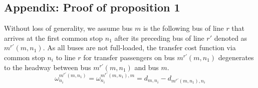 \documentclass[smallextended]{svjour3}       %
\begin{document}
\begin{Abstract}

\section*{Appendix: Proof of proposition 1}
\appendix
Without loss of generality, we assume bus $m$ is the following bus of line $r$ that arrives at the first common stop $n_{1}$ after its preceding bus of line $r'$ denoted as $m^{r'}(m,n_{1})$.
As all buses are not full-loaded, the transfer cost function via common stop $n_{i}$ to line $r$ for transfer passengers on bus $m^{r'}\left(m,n_{1}\right)$ 
degenerates to the headway between bus $m^{r'}\left(m,n_{1}\right)$ and bus $m$.
\begin{equation}
    \omega_{n_i}^{m^{r'}\left(m,n_{1}\right)} = \omega_{n_i}^{m^{r'}\left(m,n_{1}\right),m} 
    = d_{m,n_{i}}-d_{m^{r'}\left(m,n_{1}\right),n_{i}}
    \end{equation}



\end{Abstract}
\end{document}
